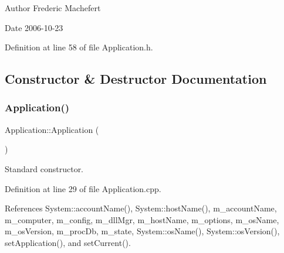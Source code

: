 \begin{DoxyAuthor}{Author}
Frederic Machefert 
\end{DoxyAuthor}
\begin{DoxyDate}{Date}
2006-\/10-\/23 
\end{DoxyDate}


Definition at line 58 of file Application.\+h.



\subsection{Constructor \& Destructor Documentation}
\mbox{\label{classApplication_afa8cc05ce6b6092be5ecdfdae44e05f8}} 
\subsubsection{\texorpdfstring{Application()}{Application()}}
{\footnotesize\ttfamily Application\+::\+Application (\begin{DoxyParamCaption}{ }\end{DoxyParamCaption})}



Standard constructor. 



Definition at line 29 of file Application.\+cpp.



References System\+::account\+Name(), System\+::host\+Name(), m\+\_\+account\+Name, m\+\_\+computer, m\+\_\+config, m\+\_\+dll\+Mgr, m\+\_\+host\+Name, m\+\_\+options, m\+\_\+os\+Name, m\+\_\+os\+Version, m\+\_\+proc\+Db, m\+\_\+state, System\+::os\+Name(), System\+::os\+Version(), set\+Application(), and set\+Current().


